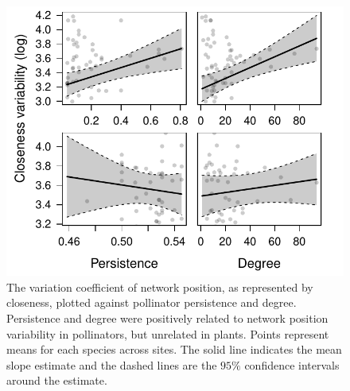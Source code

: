 \documentclass[12pt]{article}
\begin{document}
\begin{figure}
  \centering
  \includegraphics[width=.8\textwidth]{../analysis/variability/figures/cv/occ_degree.pdf}
  \caption{The variation coefficient of network position, as
    represented by closeness, plotted against pollinator persistence
    and degree. Persistence and degree were positively related to
    network position variability in pollinators, but unrelated in
    plants. Points represent means for each species across sites. The
    solid line indicates the mean slope estimate and the dashed lines
    are the $95\%$ confidence intervals around the estimate. }
  \label{fig:cv}
\end{figure}
\clearpage
\end{document}

